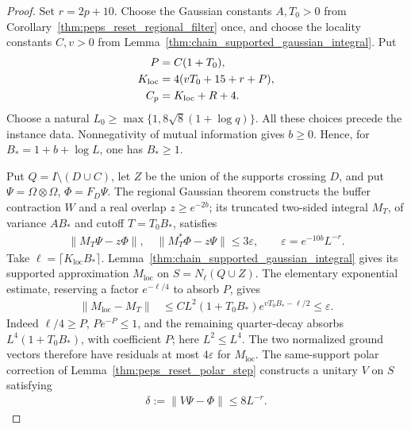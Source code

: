 \begin{proof}
    \leanok
    Set $r=2p+10$. Choose the Gaussian constants $A,T_0>0$ from
    Corollary~\ref{thm:peps_reset_regional_filter} once, and choose the locality
    constants $C,v>0$ from Lemma~\ref{thm:chain_supported_gaussian_integral}.
    Put
    \begin{align}
        P                & =C(1+T_0),\notag       \\
        K_{\mathrm{loc}} & =4(vT_0+15+r+P),\notag \\
        C_p              & =K_{\mathrm{loc}}+R+4.
    \end{align}
    Choose a natural $L_0\ge\max\{1,8\sqrt8(1+\log q)\}$.
    All these choices precede the instance data.
    Nonnegativity of mutual information gives $b\ge0$. Hence, for
    $B_*=1+b+\log L$, one has $B_*\ge1$.

    Put $Q=I\setminus(D\cup C)$, let $Z$ be the union of the supports
    crossing $D$, and put $\Psi=\Omega\otimes\Omega$, $\Phi=F_D\Psi$.
    The regional Gaussian theorem constructs the buffer contraction
    $W$ and a real overlap $z\ge e^{-2b}$; its truncated two-sided integral
    $M_T$, of variance $AB_*$ and cutoff $T=T_0B_*$, satisfies
    \begin{align}
        \|M_T\Psi-z\Phi\|,\quad\|M_T^*\Phi-z\Psi\|
        \le3\varepsilon,\qquad
        \varepsilon=e^{-10b}L^{-r}.
    \end{align}
    Take $\ell=\lceil K_{\mathrm{loc}}B_*\rceil$.
    Lemma~\ref{thm:chain_supported_gaussian_integral} gives its supported
    approximation $M_{\mathrm{loc}}$ on
    $S=N_\ell(Q\cup Z)$.
    The elementary exponential estimate, reserving a factor
    $e^{-\ell/4}$ to absorb $P$, gives
    \begin{align}
        \|M_{\mathrm{loc}}-M_T\|
         & \le C L^2(1+T_0B_*)e^{vT_0B_*-\ell/2}
        \le\varepsilon.
    \end{align}
    Indeed $\ell/4\ge P$, $P e^{-P}\le1$, and the remaining quarter-decay
    absorbs $L^4(1+T_0B_*)$, with coefficient $P$; here $L^2\le L^4$.
    The two normalized ground vectors therefore have residuals at most
    $4\varepsilon$ for $M_{\mathrm{loc}}$.
    The same-support polar correction of
    Lemma~\ref{thm:peps_reset_polar_step} constructs a unitary $V$ on $S$
    satisfying
    \begin{align}
        \delta:=\|V\Psi-\Phi\|\le8L^{-r}.
    \end{align}


\end{proof}
